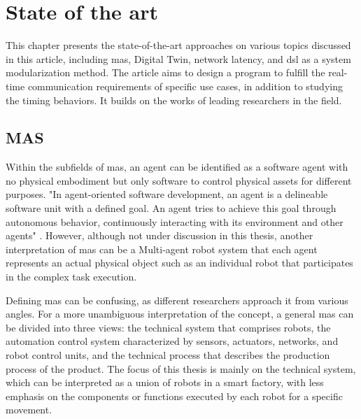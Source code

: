 \chapter{State of the art}%
This chapter presents the state-of-the-art approaches on various topics 
discussed 
in this article, including \gls{mas}, Digital Twin, network latency, 
and \gls{dsl} as a system modularization method. The article aims to 
design a program to fulfill the real-time communication requirements 
of specific use cases, in addition to studying the timing behaviors. 
It builds on the works of leading researchers in the field.

\section{MAS}

Within the subfields of \gls{mas}, an agent can be identified as a 
software agent with no physical embodiment but only software to control 
physical assets for different purposes. "In agent-oriented software 
development, an agent is a delineable software unit with a defined goal. 
An agent tries to achieve this goal through autonomous behavior, 
continuously interacting with its environment and other agents" \cite{wagner_agentenunterstutztes_2008}. 
However, although not under discussion in this thesis, another 
interpretation of \gls{mas} can be a Multi-agent robot system that 
each agent represents an actual physical object such as an individual 
robot that participates in the complex task execution\cite{ota_multi-agent_2006}.   


Defining \gls{mas} can be confusing, as different researchers approach 
it from various angles. For a more unambiguous interpretation of the 
concept, a general \gls{mas} can be divided into three views: the 
technical system that comprises robots, the automation control system 
characterized by sensors, actuators, networks, and robot control units, 
and the technical process that describes the production process of the 
product\cite{lauber_prozessautomatisierung_1999}\cite{wannagat_agent_nodate}. 
The focus of this thesis is mainly on the technical system, which can 
be interpreted as a union of robots in a smart factory, with less 
emphasis on the components or functions executed by each robot for 
a specific movement.

